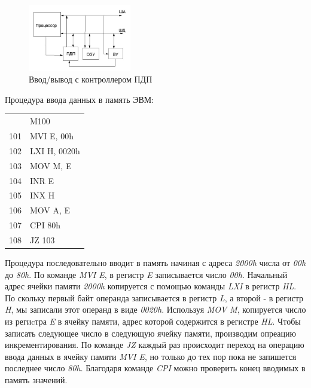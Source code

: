\documentclass[unicode, 12pt, a4paper, oneside]{article}
\begin{document}
\begin{figure}[H]
\centering
\includegraphics[width=0.4\textwidth]{107_PDP.JPG}
\caption{Ввод/вывод с контроллером ПДП}
\end{figure}  

Процедура ввода данных в память ЭВМ:

\begin{center}
\begin{tabular}{l l}
    & {} M100          \\ 
101 & {} MVI E, 00h    \\ 
102 & {} LXI H, 0020h \\ 
103 & {} MOV M, E      \\ 
104 & {} INR E         \\ 
105 & {} INX H        \\ 
106 & {} MOV A, E      \\ 
107 & {} CPI 80h       \\ 
108 & {} JZ 103        \\  
\end{tabular} 
\end{center}

Процедура последовательно вводит в память начиная с адреса {\sl 2000h} числа от {\sl 00h} до {\sl 80h}. По команде {\sl MVI E}, в регистр {\sl E} записывается число {\sl 00h}. Начальный адрес ячейки памяти {\sl 2000h} копируется с помощью команды {\it LXI} в регистр {\it HL}. По скольку первый байт операнда записывается в регистр {\sl L}, а второй - в регистр {\sl H}, мы записали этот операнд в виде {\sl 0020h}. Используя {\sl MOV M}, копируется число из региcтра {\sl E} в ячейку памяти, адрес которой содержится в регистре {\sl HL}. Чтобы записать следующее число в следующую ячейку памяти, производим опреацию инкрементирования. По команде {\sl JZ} каждый раз происходит переход на операцию ввода данных в ячейку памяти {\sl MVI E}, но только до тех пор пока не запишется последнее число {\sl 80h}. Благодаря команде {\sl CPI} можно проверить конец вводимых в память значений. 

\end{document}
